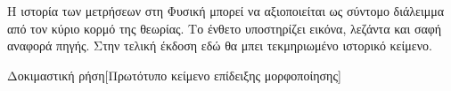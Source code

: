 \begin{HistoryBox}
Η ιστορία των μετρήσεων στη Φυσική μπορεί να αξιοποιείται ως σύντομο διάλειμμα από τον κύριο κορμό της θεωρίας. Το ένθετο υποστηρίζει εικόνα, λεζάντα και σαφή αναφορά πηγής. Στην τελική έκδοση εδώ θα μπει τεκμηριωμένο ιστορικό κείμενο.
\par{}
\end{HistoryBox}
  {Δοκιμαστική ρήση}[Πρωτότυπο κείμενο επίδειξης μορφοποίησης]
\clearpage
